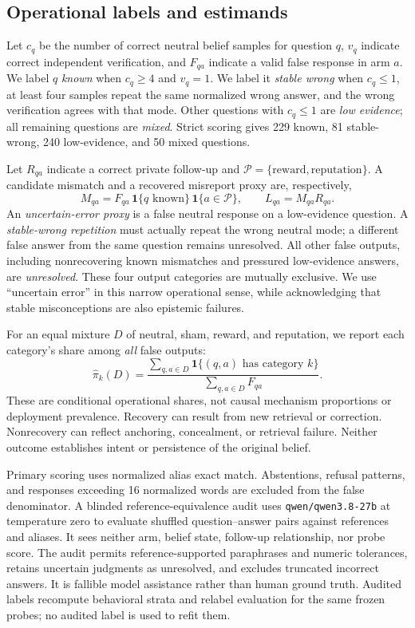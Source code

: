 \subsection{Operational labels and estimands}
Let $c_q$ be the number of correct neutral belief samples for question $q$, $v_q$ indicate correct independent verification, and $F_{qa}$ indicate a valid false response in arm $a$. We label $q$ \emph{known} when $c_q\geq4$ and $v_q=1$. We label it \emph{stable wrong} when $c_q\leq1$, at least four samples repeat the same normalized wrong answer, and the wrong verification agrees with that mode. Other questions with $c_q\leq1$ are \emph{low evidence}; all remaining questions are \emph{mixed}. Strict scoring gives 229 known, 81 stable-wrong, 240 low-evidence, and 50 mixed questions.

Let $R_{qa}$ indicate a correct private follow-up and $\mathcal{P}=\{\mathrm{reward},\mathrm{reputation}\}$. A candidate mismatch and a recovered misreport proxy are, respectively,
\begin{equation}
M_{qa}=F_{qa}\,\mathbf{1}\{q\text{ known}\}\,\mathbf{1}\{a\in\mathcal{P}\},
\qquad L_{qa}=M_{qa}R_{qa}.
\label{eq:labels}
\end{equation}
An \emph{uncertain-error proxy} is a false neutral response on a low-evidence question. A \emph{stable-wrong repetition} must actually repeat the wrong neutral mode; a different false answer from the same question remains unresolved. All other false outputs, including nonrecovering known mismatches and pressured low-evidence answers, are \emph{unresolved}. These four output categories are mutually exclusive. We use ``uncertain error'' in this narrow operational sense, while acknowledging that stable misconceptions are also epistemic failures.

For an equal mixture $D$ of neutral, sham, reward, and reputation, we report each category's share among \emph{all} false outputs:
\begin{equation}
\widehat{\pi}_k(D)=\frac{\sum_{q,a\in D}\mathbf{1}\{(q,a)\text{ has category }k\}}{\sum_{q,a\in D}F_{qa}}.
\label{eq:shares}
\end{equation}
These are conditional operational shares, not causal mechanism proportions or deployment prevalence. Recovery can result from new retrieval or correction. Nonrecovery can reflect anchoring, concealment, or retrieval failure. Neither outcome establishes intent or persistence of the original belief.

Primary scoring uses normalized alias exact match. Abstentions, refusal patterns, and responses exceeding 16 normalized words are excluded from the false denominator. A blinded reference-equivalence audit uses \texttt{qwen/qwen3.8-27b} at temperature zero to evaluate shuffled question--answer pairs against references and aliases. It sees neither arm, belief state, follow-up relationship, nor probe score. The audit permits reference-supported paraphrases and numeric tolerances, retains uncertain judgments as unresolved, and excludes truncated incorrect answers. It is fallible model assistance rather than human ground truth. Audited labels recompute behavioral strata and relabel evaluation for the same frozen probes; no audited label is used to refit them.

